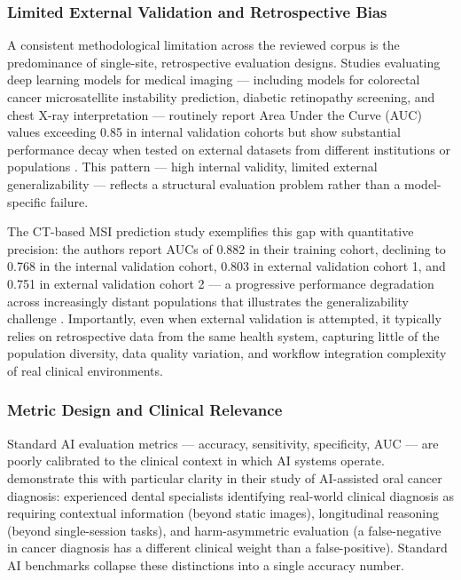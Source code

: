 
\subsubsection{Limited External Validation and Retrospective Bias}
\label{sec:eval_retrospective}

A consistent methodological limitation across the reviewed corpus is the
predominance of single-site, retrospective evaluation designs. Studies
evaluating deep learning models for medical imaging — including models for
colorectal cancer microsatellite instability prediction, diabetic retinopathy
screening, and chest X-ray interpretation — routinely report Area Under the
Curve (AUC) values exceeding 0.85 in internal validation cohorts but show
substantial performance decay when tested on external datasets from different
institutions or populations \citep{pham2025ethical}. This pattern — high
internal validity, limited external generalizability — reflects a structural
evaluation problem rather than a model-specific failure.

The CT-based MSI prediction study exemplifies this gap with quantitative
precision: the authors report AUCs of 0.882 in their training cohort,
declining to 0.768 in the internal validation cohort, 0.803 in external
validation cohort 1, and 0.751 in external validation cohort 2 — a
progressive performance degradation across increasingly distant populations
that illustrates the generalizability challenge \citep{pham2025ethical}.
Importantly, even when external validation is attempted, it typically
relies on retrospective data from the same health system, capturing little
of the population diversity, data quality variation, and workflow integration
complexity of real clinical environments.


\subsubsection{Metric Design and Clinical Relevance}
\label{sec:eval_metrics}

Standard AI evaluation metrics — accuracy, sensitivity, specificity, AUC —
are poorly calibrated to the clinical context in which AI systems operate.
\citet{turchi2025ecological} demonstrate this with particular clarity in their
study of AI-assisted oral cancer diagnosis: experienced dental specialists
identifying real-world clinical diagnosis as requiring contextual information
(beyond static images), longitudinal reasoning (beyond single-session tasks),
and harm-asymmetric evaluation (a false-negative in cancer diagnosis has a
different clinical weight than a false-positive). Standard AI benchmarks
collapse these distinctions into a single accuracy number.

